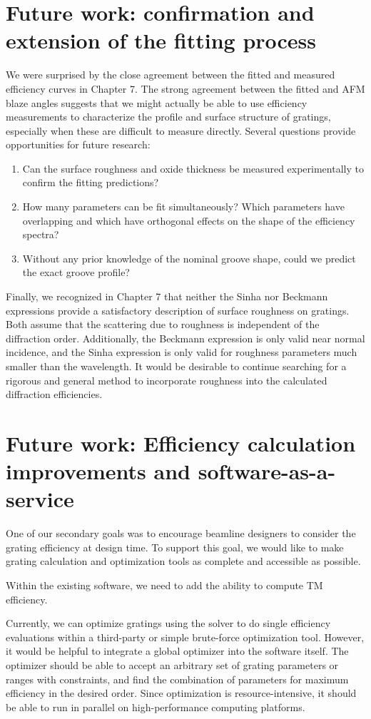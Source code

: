 \section{Future work: confirmation and extension of the fitting process}
We were surprised by the close agreement between the fitted and measured efficiency curves in Chapter 7.  The strong agreement between the fitted and AFM blaze angles suggests that we might actually be able to use efficiency measurements to characterize the profile and surface structure of gratings, especially when these are difficult to measure directly.  Several questions provide opportunities for future research:
\begin{enumerate}
\item Can the surface roughness and oxide thickness be measured experimentally to confirm the fitting predictions?
\item How many parameters can be fit simultaneously? Which parameters have overlapping and which have orthogonal effects on the shape of the efficiency spectra?
\item Without any prior knowledge of the nominal groove shape, could we predict the exact groove profile?
\end{enumerate}

Finally, we recognized in Chapter 7 that neither the Sinha nor Beckmann expressions provide a satisfactory description of surface roughness on gratings.  Both assume that the scattering due to roughness is independent of the diffraction order.  Additionally, the Beckmann expression is only valid near normal incidence, and the Sinha expression is only valid for roughness parameters much smaller than the wavelength.  It would be desirable to continue searching for a rigorous and general method to incorporate roughness into the calculated diffraction efficiencies.

\section{Future work: Efficiency calculation improvements and software-as-a-service}
One of our secondary goals was to encourage beamline designers to consider the grating efficiency at design time.  To support this goal, we would like to make grating calculation and optimization tools as complete and accessible as possible.

Within the existing software, we need to add the ability to compute TM efficiency.

Currently, we can optimize gratings using the solver to do single efficiency evaluations within a third-party or simple brute-force optimization tool.  However, it would be helpful to integrate a global optimizer into the software itself.  The optimizer should be able to accept an arbitrary set of grating parameters or ranges with constraints, and find the combination of parameters for maximum efficiency in the desired order.  Since optimization is resource-intensive, it should be able to run in parallel on high-performance computing platforms.

